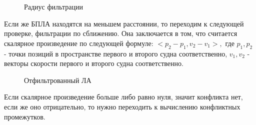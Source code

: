 \documentclass[a4paper,12pt]{article}
\numberwithin{figure}{subsubsection}
\begin{document}
\begin{figure}[ht!]
    \caption{Радиус фильтрации}\label{radius_filter}
\end{figure}

Если же БПЛА находятся на меньшем расстоянии, то переходим к следующей проверке, фильтрации по сближению. Она заключается в том, что считается скалярное произведение по следующей формуле:
$<p_2 - p_1, v_2 - v_1 >,$
где $p_1, p_2$ - точки позиций в пространстве первого и второго судна соответственно, 
$v_1, v_2$ - векторы скорости первого и второго судна соответственно.
\begin{figure}[ht!]
    \caption{Отфильтрованный ЛА}\label{check_scalar_product}
\end{figure}

Если скалярное произведение больше либо равно нуля, значит конфликта нет, если же оно отрицательно, то нужно переходить к вычислению конфликтных промежутков.
\end{document}
